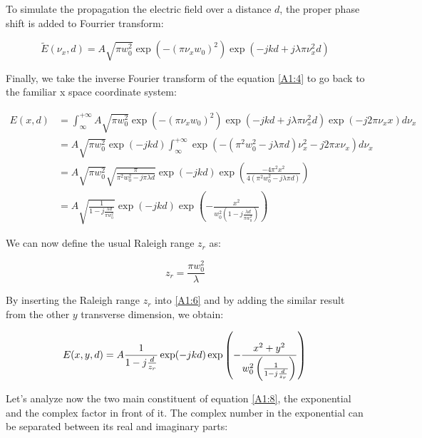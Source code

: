 To simulate the propagation the electric field over a distance $d$, the proper phase shift is added to Fourrier transform:

\begin{equation}
    \widetilde{E}(\nu_x,d) = A \sqrt{\pi w_0^2} \exp\left(-(\pi \nu_x w_0)^2 \right) \exp(-jkd +j \lambda \pi \nu_x^2 d)
\label{A1:4}
\end{equation}

Finally, we take the inverse Fourier transform of the equation \ref{A1:4} to go back to the familiar x space coordinate system:

\begin{equation}
\begin{split}
   E(x,d) & = \int^{+\infty}_{\infty} A \sqrt{\pi w_0^2} \exp\left(-(\pi \nu_x w_0)^2 \right) \exp(-jkd +j \lambda \pi \nu_x^2 d) \exp(-j 2 \pi \nu_x x) d \nu_x  \\
   & = A \sqrt{\pi w_0^2} \exp(-jkd) \int^{+\infty}_{\infty} \exp \left( -(\pi^2 w_0^2 - j \lambda \pi d)\nu_x^2 -j 2 \pi x  \nu_x  \right) d \nu_x \\
   & = A  \sqrt{\pi w_0^2} \sqrt{\frac{\pi}{\pi^2 w_0^2 - j \pi \lambda d}}\exp(-jkd) \exp \left(\frac{-4 \pi^2 x^2}{4 (\pi^2 w_0^2 - j \lambda \pi d )} \right)\\
   & = A \sqrt{\frac{1}{1 - j \frac{\lambda d}{\pi w_0^2}}} \exp(-jkd) \exp\left(-\frac{x^2}{w_0^2 \left(1 -j \frac{\lambda d}{\pi w_0^2}\right)}\right)
\label{A1:6}
\end{split}
\end{equation}

We can now define the usual Raleigh range $z_r$ as:

\begin{equation}
    z_r = \frac{\pi w_0^2}{\lambda}
\label{A1:7}
\end{equation}

By inserting the Raleigh range $z_r$ into \ref{A1:6} and by adding the similar result from the other $y$ transverse dimension, we obtain:

\begin{equation}
   E(x,y,d) = A \frac{1}{1 - j \frac{d}{z_r}} \exp(-jkd) \exp\left(- \frac{x^2 +  y^2}{w_0^2 \left(\frac{1}{1 - j \frac{d}{z_r}} \right) } \right)\\
\label{A1:8}
\end{equation}

Let's analyze now the two main constituent of equation \ref{A1:8}, the exponential and the complex factor in front of it. The complex number in the exponential can be separated between its real and imaginary parts:


